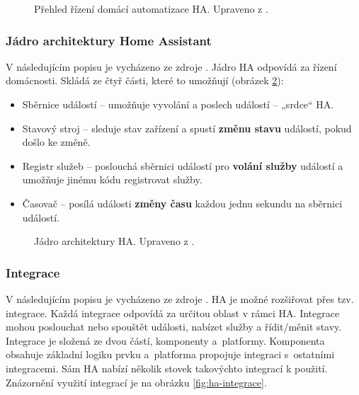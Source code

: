 \begin{figure}[H]
    \centering
    \def\svgwidth{\columnwidth}
    
    \caption[Přehled řízení domácí automatizace HA.]{Přehled řízení domácí automatizace HA. Upraveno z \cite{home-assistant-architektura}.}
    \label{fig:ha-prehled-domaci-autmatizace}
\end{figure}

\subsubsection{Jádro architektury Home Assistant}
V následujícím popisu je vycházeno ze zdroje \cite{home-assistant-jadro-architektury}. Jádro HA odpovídá za řízení domácnosti. Skládá ze čtyř části, které to umožňují (obrázek \ref{fig:ha-jadro-architektury}):

\begin{itemize}
\item Sběrnice událostí – umožňuje vyvolání a poslech událostí – „srdce“ HA.
\item Stavový stroj – sleduje stav zařízení a spustí \textbf{změnu stavu} událostí, pokud došlo ke změně.
\item  Registr služeb – poslouchá sběrnici událostí pro \textbf{volání služby} událostí a umožňuje jinému kódu registrovat služby.
\item Časovač – posílá události \textbf{změny času} každou jednu sekundu na sběrnici událostí.
\end{itemize}

\begin{figure}[H]
    \centering
    \def\svgwidth{\columnwidth}
    
    \caption[Jádro architektury HA.]{Jádro architektury HA. Upraveno z \cite{home-assistant-jadro-architektury}.}
    \label{fig:ha-jadro-architektury}
\end{figure}

\subsubsection{Integrace}
V následujícím popisu je vycházeno ze zdroje \cite{home-assistant-integrace}. HA je možné rozšiřovat přes tzv. integrace. Každá integrace odpovídá za určitou oblast v rámci HA. Integrace mohou poslouchat nebo spouštět  události, nabízet služby a řídit/měnit stavy.  Integrace je složená ze dvou částí, komponenty a~platformy. Komponenta obsahuje základní logiku prvku a~platforma propojuje integraci s~ostatními integracemi. Sám HA nabízí několik stovek takovýchto integrací k použití. Znázornění využití integrací je na obrázku \ref{fig:ha-integrace}.

